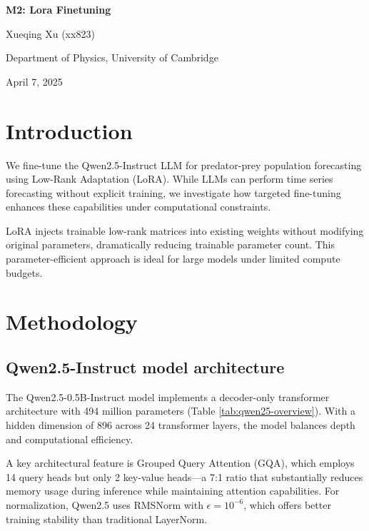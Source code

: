 \documentclass{article}
\begin{document}
\begin{center}
    \huge\textbf{M2: Lora Finetuning}
\end{center}



\begin{center}
    \Large Xueqing Xu (xx823)
    
    Department of Physics, University of Cambridge
    
    April 7, 2025
\end{center}

\section*{Introduction}
We fine-tune the Qwen2.5-Instruct LLM for predator-prey population forecasting using Low-Rank Adaptation (LoRA). While LLMs can perform time series forecasting without explicit training\cite{gruver2023large}, we investigate how targeted fine-tuning enhances these capabilities under computational constraints.

LoRA injects trainable low-rank matrices into existing weights without modifying original parameters, dramatically reducing trainable parameter count. This parameter-efficient approach is ideal for large models under limited compute budgets.
\section*{Methodology}
\subsection*{Qwen2.5-Instruct model architecture}
The Qwen2.5-0.5B-Instruct model implements a decoder-only transformer architecture with 494 million parameters (Table \ref{tab:qwen25-overview}). With a hidden dimension of 896 across 24 transformer layers, the model balances depth and computational efficiency.

A key architectural feature is Grouped Query Attention (GQA), which employs 14 query heads but only 2 key-value heads—a 7:1 ratio that substantially reduces memory usage during inference while maintaining attention capabilities. For normalization, Qwen2.5 uses RMSNorm with $\epsilon = 10^{-6}$, which offers better training stability than traditional LayerNorm.
\end{document}
